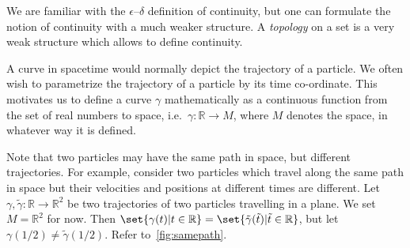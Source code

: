 \documentclass[a4 paper, oneside, 12pt]{book}
\theoremstyle{definition}
\newcommand{\rr}{\mathbb{R}}
\begin{document}

	We are familiar with the \(\epsilon–\delta\) definition of continuity, but one can formulate the notion of continuity with a much weaker structure. A \textit{topology} on a set is a very weak structure which allows to define continuity.

	A curve in spacetime would normally depict the trajectory of a particle. We often wish to parametrize the trajectory of a particle by its time co-ordinate. This motivates us to define a curve \(\gamma\) mathematically as a continuous function from the set of real numbers to space, i.e.\ \(\gamma \colon \rr \rightarrow M\), where \(M\) denotes the space, in whatever way it is defined.

	Note that two particles may have the same path in space, but different trajectories. For example, consider two particles which travel along the same path in space but their velocities and positions at different times are different. Let \(\gamma, \tilde\gamma \colon \rr \rightarrow \rr^2\) be two trajectories of two particles travelling in a plane. We set \(M = \rr^2\) for now. Then \(\set{\gamma(t) | t \in \rr} = \set{\tilde\gamma(\tilde t) | \tilde t \in \rr}\), but let \(\gamma(1/2) \neq \tilde\gamma(1/2)\). Refer to~\cref{fig:samepath}.
\end{document}
